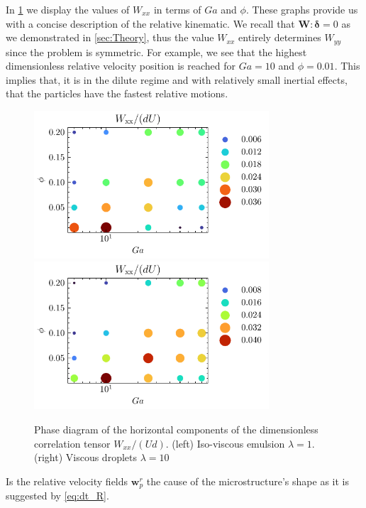In \ref{fig:phase} we display the values of $W_{xx}$ in terms of $Ga$ and $\phi$. 
These graphs provide us with a concise description of the relative kinematic. 
We recall that $\textbf{W}:\bm\delta = 0$ as we demonstrated in \ref{sec:Theory}, thus the value  $W_{xx}$ entirely determines $W_{yy}$ since the problem is symmetric. 
For example, we see that the highest dimensionless relative velocity position is reached for $Ga = 10$ and $\phi = 0.01$. 
This implies that, it is in the dilute regime and with relatively small inertial effects, that the particles have the fastest relative motions. 
\begin{figure}[h!]
    \centering
    \includegraphics[height=5.5cm]{image/HOMOGENEOUS_NEW/PA/phase_Wxx_l_1.pdf}
    \includegraphics[height=5.5cm]{image/HOMOGENEOUS_NEW/PA/phase_Wxx_l_10.pdf}
    \caption{Phase diagram of the horizontal components of the dimensionless correlation tensor $W_{xx}/(Ud)$. 
        (left) Iso-viscous emulsion $\lambda = 1$.
        (right) Viscous droplets $\lambda = 10$ }
    \label{fig:phase}
\end{figure}
Is the relative velocity fields $\textbf{w}_p^r$ the cause of the microstructure's shape as it is suggested by \ref{eq:dt_R}. 
